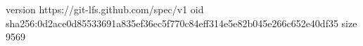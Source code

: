 version https://git-lfs.github.com/spec/v1
oid sha256:0d2ace0d85533691a835ef36ec5f770c84eff314e5e82b045e266c652e40df35
size 9569
